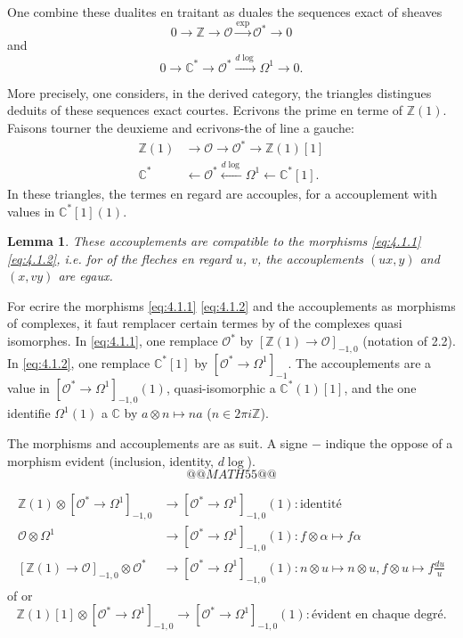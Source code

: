 \documentclass[12pt,a4paper]{article}
\theoremstyle{plain}
\newtheorem{lemma}[theorem]{Lemma}
\theoremstyle{definition}
\theoremstyle{remark}
\newcommand{\cO}{\mathcal{O}}
\newcommand{\Z}{\mathbb{Z}}
\newcommand{\C}{\mathbb{C}}
\providecommand{\cO}{\mathcal{O}}
\begin{document}
One combine these dualites en traitant as duales the sequences exact of sheaves
\[
0 \to \Z \to \cO \xrightarrow{\exp} \cO^* \to 0
\]
and
\[
0 \to \C^* \to \cO^* \xrightarrow{d\log} \Omega^1 \to 0.
\]

More precisely, one considers, in the derived category, the triangles distingues
deduits of these sequences exact courtes. Ecrivons the prime en terme of $\Z(1)$. Faisons
tourner the deuxieme and ecrivons-the of line a gauche:
\begin{align}
\Z(1) &\to \cO \to \cO^* \to \Z(1)[1] \label{eq:4.1.1} \\
\C^* &\leftarrow \cO^* \xleftarrow{d\log} \Omega^1 \leftarrow \C^*[1]. \label{eq:4.1.2}
\end{align}
In these triangles, the termes en regard are accouples, for a accouplement
with values in $\C^*[1](1)$.

\begin{lemma}
These accouplements are compatible to the morphisms \eqref{eq:4.1.1} \eqref{eq:4.1.2},
i.e. for of the fleches en regard $u$, $v$, the accouplements $(ux, y)$ and $(x, vy)$ are egaux.
\end{lemma}

For ecrire the morphisms \eqref{eq:4.1.1} \eqref{eq:4.1.2} and the accouplements as morphisms
of complexes, it faut remplacer certain termes by of the complexes quasi isomorphes.
In \eqref{eq:4.1.1}, one remplace $\cO^*$ by $[\Z(1) \to \cO]_{-1,0}$ (notation of 2.2). In \eqref{eq:4.1.2}, one
remplace $\C^*[1]$ by $[\cO^* \to \Omega^1]_{-1}$. The accouplements are a value in $[\cO^* \to \Omega^1]_{-1,0}(1)$,
quasi-isomorphic a $\C^*(1)[1]$, and the one identifie $\Omega^1(1)$ a $\C$ by $a \otimes n \mapsto na$ ($n \in 2\pi i\Z$).

The morphisms and accouplements are as suit. A signe $-$ indique the oppose of a
morphism evident (inclusion, identity, $d\log$).
\[
@@MATH55@@
\]

\begin{align*}
\Z(1) \otimes [\cO^* \to \Omega^1]_{-1,0} &\to [\cO^* \to \Omega^1]_{-1,0}(1) : \text{identité} \\
\cO \otimes \Omega^1 &\to [\cO^* \to \Omega^1]_{-1,0}(1) : f \otimes \alpha \mapsto f\alpha \\
[\Z(1) \to \cO]_{-1,0} \otimes \cO^* &\to [\cO^* \to \Omega^1]_{-1,0}(1) : n \otimes u \mapsto n \otimes u, f \otimes u \mapsto f \frac{du}{u}
\end{align*}
of or
\[
\Z(1)[1] \otimes [\cO^* \to \Omega^1]_{-1,0} \to [\cO^* \to \Omega^1]_{-1,0}(1) : \text{évident en chaque degré}.
\]
\end{document}
